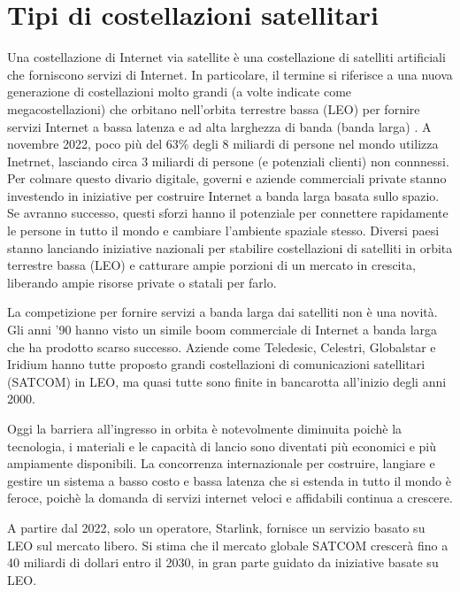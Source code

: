 
\chapter{Tipi di costellazioni satellitari}
\label{chp:intro}

Una costellazione di Internet via satellite è una costellazione di satelliti artificiali che forniscono servizi di Internet. In particolare, il termine si riferisce a una nuova generazione di costellazioni molto grandi (a volte indicate come megacostellazioni) che orbitano nell'orbita terrestre bassa (LEO) per fornire servizi Internet a bassa latenza e ad alta larghezza di banda (banda larga) \cite{jose_del_rosario_nsr_2018}.
A novembre 2022, poco più del 63\% degli 8 miliardi di persone nel mondo utilizza Inetrnet, lasciando circa 3 miliardi di persone (e potenziali clienti) non connnessi.
Per colmare questo divario digitale, governi e aziende commerciali private stanno investendo in iniziative per costruire Internet a banda larga basata sullo spazio.
Se avranno successo, questi sforzi hanno il potenziale per connettere rapidamente le persone in tutto il mondo e cambiare l'ambiente spaziale stesso.
Diversi paesi stanno lanciando iniziative nazionali per stabilire costellazioni di satelliti in orbita terrestre bassa (\ac{LEO}) e catturare ampie porzioni di un mercato in crescita, liberando ampie risorse private o statali per farlo.

La competizione per fornire servizi a banda larga dai satelliti non è una novità.
Gli anni '90 hanno visto un simile boom commerciale di Internet a banda larga che ha prodotto scarso successo.
Aziende come Teledesic, Celestri, Globalstar e Iridium hanno tutte proposto grandi costellazioni di comunicazioni satellitari (SATCOM) in \ac{LEO}, ma quasi tutte sono finite in bancarotta all'inizio degli anni 2000.

Oggi la barriera all'ingresso in orbita è notevolmente diminuita poichè la tecnologia, i materiali e le capacità di lancio sono diventati più economici e più ampiamente disponibili.
La concorrenza internazionale per costruire, langiare e gestire un sistema a basso costo e bassa latenza che si estenda in tutto il mondo è feroce, poichè la domanda di servizi internet veloci e affidabili continua a crescere.

A partire dal 2022, solo un operatore, Starlink, fornisce un servizio basato su \ac{LEO} sul mercato libero.
Si stima che il mercato globale SATCOM crescerà fino a 40 miliardi di dollari entro il 2030, in gran parte guidato da iniziative basate su \ac{LEO}.

